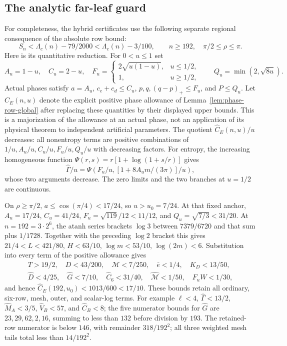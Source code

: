 \subsection{The analytic far-leaf guard}

For completeness, the hybrid certificates use the following separate
regional consequence of the absolute row bound:
\begin{equation}
 S_n<\Lambda_c(n)-79/2000<\Lambda_c(n)-3/100,
 \qquad n\geq192,\quad \pi/2\leq\rho\leq\pi.
                                                        \label{eq:argmax-far192}
\end{equation}
Here is its quantitative reduction.  For $0<u\leq1$ set
\[
 A_u=1-u,\quad C_u=2-u,\quad
 F_u=\begin{cases}2\sqrt{u(1-u)},&u\leq1/2,\\1,&u\geq1/2,\end{cases}
 \qquad Q_u=\min(2,\sqrt{8u}).
\]
Actual phases satisfy $a=A_u$, $c_e+c_d\leq C_u$,
$p,q,(q-p)_+\leq F_u$, and $P\leq Q_u$.
Let $\widehat C_E(n,u)$ denote the explicit positive phase allowance
of Lemma~\ref{lem:phase-row-global} after replacing these quantities
by their displayed upper bounds.  This is a majorization of the
allowance at an actual phase, not an application of its physical
theorem to independent artificial parameters.  The quotient
$\widehat C_E(n,u)/u$ decreases: all nonentropy terms are positive
combinations of $1/u,A_u/u,C_u/u,F_u/u,Q_u/u$ with decreasing factors.
For entropy, the increasing homogeneous function
$\Psi(r,s)=r[1+\log(1+s/r)]$ gives
\[
 \widehat\Gamma/u
 =\Psi\left(F_u/u,[1+8A_um/(3\pi)]/u\right),
\]
whose two arguments decrease.  The zero limits and the two branches
at $u=1/2$ are continuous.

On $\rho\geq\pi/2$, $a\leq\cos(\pi/4)<17/24$, so $u>u_0=7/24$.
At that fixed anchor,
$A_u=17/24$, $C_u=41/24$, $F_u=\sqrt{119}/12<11/12$,
and $Q_u=\sqrt{7/3}<31/20$.  At $n=192=3\cdot2^6$, the atanh
series brackets $\log3$ between $7379/6720$ and that sum plus
$1/1728$.  Together with the preceding $\log2$ bracket this gives
$21/4<L<421/80$, $H<63/10$, $\log m<53/10$, $\log(2m)<6$.
Substitution into every term of the positive allowance gives
\[
 \begin{gathered}
 T>19/2,\quad D<43/200,\quad\mathcal M<7/250,
 \quad\bar e<1/4,\quad K_D<13/50,\\
 \widehat D<4/25,\quad\widehat G<7/10,
 \quad\widehat C_6<31/40,\quad\widehat{\mathcal M}<1/50,
 \quad F_uW<1/30,
 \end{gathered}
\]
and hence $\widehat C_E(192,u_0)<1013/600<17/10$.
These bounds retain all ordinary, six-row, mesh, outer, and scalar-log
terms.  For example $\ell<4$, $\widehat\Gamma<13/2$,
$\widehat M_A<3/5$, $\widehat V_B<57$, and $\widehat C_B<8$;
the five numerator bounds for $\widehat G$ are
$23,29,62,2,16$, summing to less than $132$ before division by $193$.
The retained-row numerator is below $146$, with remainder
$318/192^2$; all three weighted mesh tails total less than $14/192^2$.

